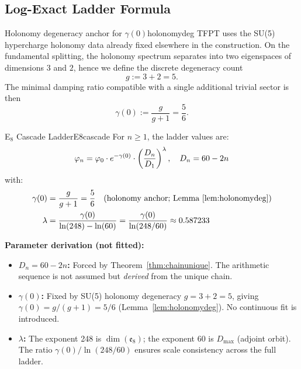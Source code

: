 \subsection{Log-Exact Ladder Formula}

\begin{lemma}{Holonomy degeneracy anchor for $\gamma(0)$}{holonomydeg}
TFPT uses the SU(5) hypercharge holonomy data already fixed elsewhere in the construction.
On the fundamental splitting, the holonomy spectrum separates into two eigenspaces of dimensions $3$ and $2$, hence we define the discrete degeneracy count
\[
g:=3+2=5.
\]
The minimal damping ratio compatible with a single additional trivial sector is then
\[
\gamma(0):=\frac{g}{g+1}=\frac56.
\]
\end{lemma}

\begin{definition}{E$_8$ Cascade Ladder}{E8cascade}
For $n \geq 1$, the ladder values are:
\begin{equation}
    \varphi_n = \varphi_0 \cdot e^{-\gamma(0)} \cdot 
        \left(\frac{D_n}{D_1}\right)^\lambda, \quad D_n = 60 - 2n
    \label{eq:ladder}
\end{equation}
with:
\begin{align}
    \gamma(0) &= \frac{g}{g+1}=\frac{5}{6} \quad \text{(holonomy anchor; Lemma~\ref{lem:holonomydeg})}\\
    \lambda &= \frac{\gamma(0)}{\ln(248) - \ln(60)} = \frac{\gamma(0)}{\ln(248/60)} 
        \approx 0.587233
\end{align}
\end{definition}

\textbf{Parameter derivation (not fitted):}
\begin{itemize}[leftmargin=1.5em, topsep=2pt, itemsep=2pt]
    \item \textbf{$D_n = 60 - 2n$:} Forced by Theorem~\ref{thm:chainunique}. The 
        arithmetic sequence is not assumed but \emph{derived} from the unique chain.
    \item \textbf{$\gamma(0)$:} Fixed by SU(5) holonomy degeneracy $g=3+2=5$, giving $\gamma(0)=g/(g+1)=5/6$ (Lemma~\ref{lem:holonomydeg}). No continuous fit is introduced.
    \item \textbf{$\lambda$:} The exponent 248 is $\dim(\mathfrak{e}_8)$; the exponent 60 
        is $D_{\max}$ (adjoint orbit). The ratio $\gamma(0)/\ln(248/60)$ ensures scale 
        consistency across the full ladder.
\end{itemize}

